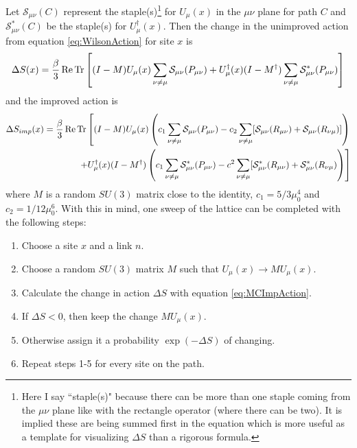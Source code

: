 \documentclass[11pt]{article}
\begin{document}
Let $\mathcal{S}_{\mu\nu}(C)$ represent the staple(s)\footnote{Here I say ``staple(s)" because there can be more than one staple coming from the $\mu\nu$ plane like with the rectangle operator (where there can be two). It is implied these are being summed first in the equation which is more useful as a template for visualizing $\Delta S$ than a rigorous formula.} for $U_\mu(x)$ in the $\mu\nu$ plane for path $C$ and $\mathcal{S}^*_{\mu\nu}(C)$ be the staple(s) for $U_\mu^\dagger(x)$. Then the change in the unimproved action from equation \ref{eq:WilsonAction} for site $x$ is
\begin{align}
	\Delta S(x)=\frac{\beta}{3}\Re\Trace\left[(I-M)U_\mu(x)\sum_{\nu\neq\mu}\mathcal{S}_{\mu\nu}(P_{\mu\nu})+U^\dagger_\mu(x)(I-M^\dagger)\sum_{\nu\neq\mu}\mathcal{S}^*_{\mu\nu}(P_{\mu\nu})\right]
	\label{eq:MCNormAction}
\end{align}
and the improved action is
\begin{align}
\begin{split}
	\Delta S_{imp}(x)=\frac{\beta}{3}\Re\Trace\left[(I-M)U_\mu(x)\left(c_1\sum_{\nu\neq\mu}\mathcal{S}_{\mu\nu}(P_{\mu\nu})-c_2\sum_{\nu\neq\mu}[\mathcal{S}_{\mu\nu}(R_{\mu\nu})+\mathcal{S}_{\mu\nu}(R_{\nu\mu})]\right)\right.\\
	\left.+U^\dagger_\mu(x)(I-M^\dagger)\left(c_1\sum_{\nu\neq\mu}\mathcal{S}^*_{\mu\nu}(P_{\mu\nu})-c^2\sum_{\nu\neq\mu}[\mathcal{S}^*_{\mu\nu}(R_{\mu\nu})+\mathcal{S}^*_{\mu\nu}(R_{\nu\mu})\right)\right]
\end{split}
	\label{eq:MCImpAction}
\end{align}
where $M$ is a random $SU(3)$ matrix close to the identity, $c_1=5/3\mu_0^4$ and $c_2=1/12\mu_0^6$. With this in mind, one sweep of the lattice can be completed with the following steps:
\begin{enumerate}
\item Choose a site $x$ and a link $n$.
\item Choose a random $SU(3)$ matrix $M$ such that $U_\mu(x)\to MU_\mu(x)$.
\item Calculate the change in action $\Delta S$ with equation \ref{eq:MCImpAction}.
\item If $\Delta S<0$, then keep the change $MU_\mu(x)$.
\item Otherwise assign it a probability $\exp(-\Delta S)$ of changing.
\item Repeat steps 1-5 for every site on the path.
\end{enumerate}
\end{document}

